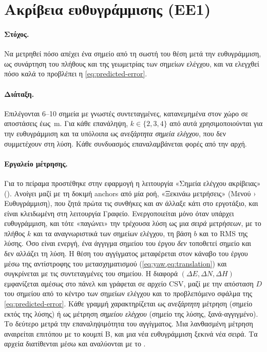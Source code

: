 \section{Ακρίβεια ευθυγράμμισης (ΕΕ1)}
\label{sec:exp-alignment}


\paragraph{Στόχος.} Να μετρηθεί πόσο απέχει ένα σημείο από τη σωστή του θέση μετά την ευθυγράμμιση, ως συνάρτηση του πλήθους και της γεωμετρίας των σημείων ελέγχου, και να ελεγχθεί πόσο καλά το προβλέπει η \cref{eq:predicted-error}.

\paragraph{Διάταξη.} Επιλέγονται 6--10 σημεία με γνωστές συντεταγμένες, κατανεμημένα στον χώρο σε αποστάσεις έως \,m. Για κάθε επανάληψη, $k \in \{2, 3, 4\}$ από αυτά χρησιμοποιούνται για την ευθυγράμμιση και τα υπόλοιπα ως \emph{ανεξάρτητα σημεία ελέγχου}, που δεν συμμετέχουν στη λύση. Κάθε συνδυασμός επαναλαμβάνεται  φορές από την αρχή.

\paragraph{Εργαλείο μέτρησης.} Για το πείραμα προστέθηκε στην εφαρμογή η λειτουργία «Σημεία ελέγχου ακρίβειας» (). Ανοίγει μαζί με τη δοκιμή anchors από μία ροή, «Ξεκινάω μετρήσεις» (Μενού › Ευθυγράμμιση), που ζητά πρώτα τις συνθήκες και αν άλλαξε κάτι στο εργοτάξιο, και είναι κλειδωμένη στη λειτουργία Γραφείο. Ενεργοποιείται μόνο όταν υπάρχει ευθυγράμμιση, και τότε «παγώνει» την τρέχουσα λύση ως μια \emph{σειρά} μετρήσεων, με το πλήθος $k$ και τα αναγνωριστικά των σημείων ελέγχου, τη βάση $b$ και το RMS της λύσης. Όσο είναι ενεργή, ένα άγγιγμα σημείου του έργου \emph{δεν} τοποθετεί σημείο και δεν αλλάζει τη λύση. Η θέση του αγγίγματος μεταφέρεται στον κάναβο του έργου μέσω της αντίστροφης του μετασχηματισμού (\cref{eq:yaw,eq:translation}) και συγκρίνεται με τις συντεταγμένες του σημείου. Η διαφορά $(\Delta E, \Delta N, \Delta H)$ εμφανίζεται αμέσως στο πάνελ και γράφεται σε αρχείο CSV, μαζί με την απόσταση $D$ του σημείου από το κέντρο των σημείων ελέγχου και το προβλεπόμενο σφάλμα της \cref{eq:predicted-error}. Κάθε γραμμή χαρακτηρίζεται ως \emph{ανεξάρτητη} μέτρηση (σημείο εκτός της λύσης) ή ως μέτρηση \emph{σημείου ελέγχου} (σημείο της λύσης, ξανά-αγγιγμένο). Το δεύτερο μετρά την επαναληψιμότητα του αγγίγματος. Μια λανθασμένη μέτρηση αναιρείται επιτόπου με το κουμπί B, και μια νέα ευθυγράμμιση ξεκινά νέα σειρά. Τα αρχεία διατίθενται μέσω  και αναλύονται με το .

